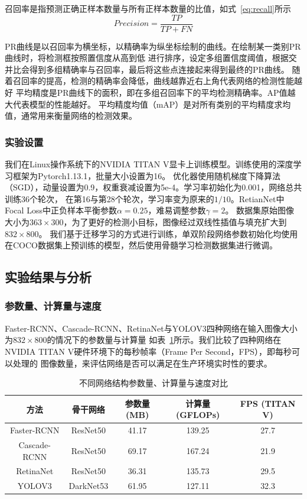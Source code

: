 召回率是指预测正确正样本数量与所有正样本数量的比值，如式~\ref{eq:recall}所示
\begin{equation}               
  Precision = \frac{TP}{TP + FN}
  \label{eq:recall}     
\end{equation} 

PR曲线是以召回率为横坐标，以精确率为纵坐标绘制的曲线。在绘制某一类别PR曲线时，将检测框按照置信度从高到低
进行排序，设定多组置信度阈值，根据交并比会得到多组精确率与召回率，最后将这些点连接起来得到最终的PR曲线。
随着召回率的提高，检测的精确率会降低，曲线越靠近右上角代表网络的检测性能越好
平均精度是PR曲线下的面积，即在多组召回率下的平均检测精确率。AP值越大代表模型的性能越好。
平均精度均值（mAP）是对所有类别的平均精度求均值，通常用来衡量网络的检测效果。

\subsubsection{实验设置}
我们在Linux操作系统下的NVIDIA TITAN V显卡上训练模型。训练使用的深度学习框架为Pytorch1.13.1，批量大小设置为16。
优化器使用随机梯度下降算法（SGD），动量设置为0.9，权重衰减设置为5e-4。学习率初始化为0.001，网络总共训练36个轮次，
在第16与第28个轮次，学习率变为原来的$1/10$。RetianNet中Focal Loss中正负样本平衡参数$\alpha=0.25$，难易调整参数$\gamma=2$。
数据集原始图像大小为$363 \times 300$，为了更好的检测小目标，图像经过双线性插值与填充扩大到$832 \times 800$。
我们基于迁移学习的方式进行训练，单双阶段网络参数初始化均使用在COCO数据集上预训练的模型，然后使用骨髓学习检测数据集进行微调。

\subsection{实验结果与分析}
\subsubsection{参数量、计算量与速度}

Faster-RCNN、Cascade-RCNN、RetinaNet与YOLOV3四种网络在输入图像大小为$832 \times 800$的情况下的参数量与计算量
如表~\ref{table:cell_Network}所示。我们比较了四种网络在NVIDIA TITAN V硬件环境下的每秒帧率（Frame Per Second，FPS），即每秒可以处理的
图像数量，来评估网络是否可以满足在生产环境实时性的要求。

\begin{table}
  \caption{不同网络结构参数量、计算量与速度对比}   
  \centering 
  \label{table:cell_Network}
  \begin{tabular}{ccccc}
    \toprule[2pt]
    方法 & 骨干网络  & 参数量(MB) & 计算量(GFLOPs) & FPS (TITAN V) \\
    \midrule[1.5pt] 
    Faster-RCNN & ResNet50 &  41.17 & 139.25 & 27.7 \\ 
    Cascade-RCNN & ResNet50 & 69.17 & 167.24 & 21.9   \\ 
    RetinaNet & ResNet50 & 36.31 & 135.73 & 29.5   \\ 
    YOLOV3 & DarkNet53 & 61.95 & 127.11 & 32.3  \\ 
    \bottomrule[2pt]      
  \end{tabular} 
\end{table}

